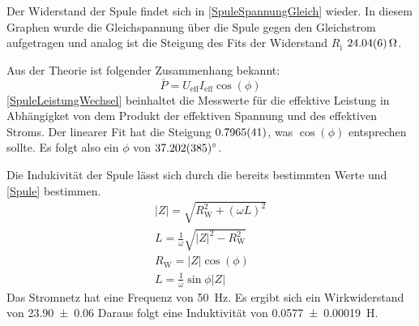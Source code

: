 \documentclass[
	a4paper,
	12pt,
	pagesize,
	ngerman
]{scrartcl}
\begin{document}
	Der Widerstand der Spule findet sich in \cref{SpuleSpannungGleich} wieder. 
	In diesem Graphen wurde die Gleichspannung über die Spule gegen den Gleichstrom aufgetragen und analog ist die Steigung des Fits der Widerstand $R_\text{i}$ $\SI{24,04 \pm 0,06}{\Omega}$.

	Aus der Theorie ist folgender Zusammenhang bekannt:
	\begin{equation}
		\bar{P} = U_\text{eff} I_\text{eff} \cos(\phi)
	\end{equation}
	\cref{SpuleLeistungWechsel} beinhaltet die Messwerte für die effektive Leistung in Abhängigket von dem Produkt der effektiven Spannung und des effektiven Stroms. 
	Der linearer Fit hat die Steigung $\SI{0,7965\pm 0,0041}{}$, was $\cos(\phi)$ entsprechen sollte. 
	Es folgt also ein $\phi$ von $\ang{37,202\pm 0,385}$.

	Die Indukivität der Spule lässt sich durch die bereits bestimmten Werte und \cref{Spule} bestimmen.
	\begin{gather}
		\label{Spule}
		|Z| = \sqrt{R_\text{W}^2 + (\omega L)^2} \\
		L = \frac{1}{\omega}\sqrt{|Z|^2-R_\text{W}^2} \\
		R_\text{W} = |Z| \cos(\phi)  \\
		L = \frac{1}{\omega} \sin{\phi} |Z|
	\end{gather}
		Das Stromnetz hat eine Frequenz von \SI{50}{Hz}. %
		Es ergibt sich ein Wirkwiderstand von \SI{23,90 \pm 0,06}{\Omega}
		Daraus folgt eine Induktivität von \SI{0,0577 \pm 0,00019}{H}. %
	
\end{document}
